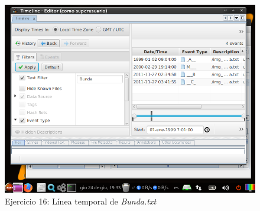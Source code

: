 \documentclass[11pt]{article}
\begin{document}
\begin{figure}[H]
    \caption{Ejercicio 16: Línea temporal de \textit{Bunda.txt}}
    \centering
    \includegraphics[scale=0.7]{e16-8.png}
\end{figure}



\begin{thebibliography}{8}
\end{thebibliography}
\end{document}

